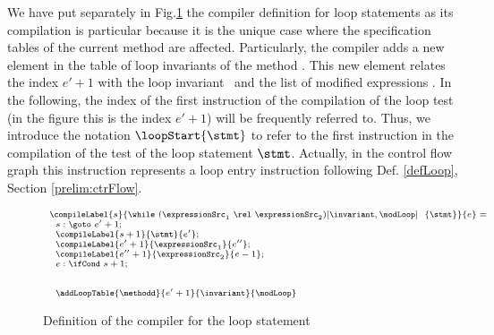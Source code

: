  We have put separately in Fig.\ref{pogEq:compile:compExpr:defLoop} the compiler definition for loop statements as its compilation is particular
 because it is the unique case where the specification tables of the current method are affected. 
 Particularly, the compiler adds a new element in the table of loop invariants of the method \methodd. 
 This new element relates  the index $e'+1$  with the loop invariant \invariant \  and the
 list of modified expressions \modLoop.
 In the following, the index of the first instruction of the compilation of the loop test
 (in the figure this is the index $e'+1$) will be frequently referred to. 
 Thus, we introduce the notation $\loopStart{\stmt}$ to refer to the first instruction in the compilation of the test
 of the loop statement $\stmt$. Actually, in the control flow graph this instruction represents a loop entry
 instruction following Def. \ref{defLoop}, Section \ref{prelim:ctrFlow}.
 
 
\begin{figure}[ht!]
\begin{frameit}
$${\scriptsize 
        \begin{array}{l}
 \compileLabel{s}{\while \ (\expressionSrc_1 \ \rel  \ \expressionSrc_2) \lbrack \invariant, \modLoop \rbrack \ \do \ \{ \stmt \} }{e} = \\
         \begin{array}{l}
	       s: \goto \ e' + 1; \\
	       \compileLabel{s +  1}{\stmt}{e' }; \\
	       \compileLabel{e' +  1}{\expressionSrc_1}{e''};\\
	       \compileLabel{e'' +  1}{\expressionSrc_2}{e-1};\\
	       e : \ifCond \ s +  1; \\
	       \\\\
	       \addLoopTable{\methodd}{e'+1}{\invariant }{\modLoop}
	 \end{array}

\end{array} 
} $$

\caption{\sc Definition of the compiler for the loop statement}
\label{pogEq:compile:compExpr:defLoop}
\end{frameit}
\end{figure}



